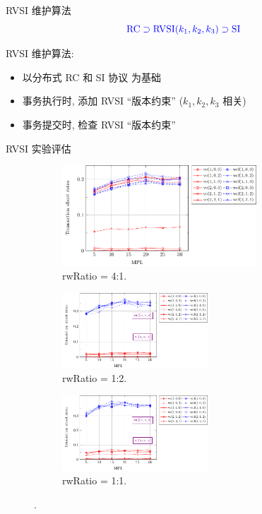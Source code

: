 \begin{frame}{RVSI 维护算法}
  \[
    \textcolor{blue}{\text{RC} \supset \text{RVSI}(k_1, k_2, k_3) \supset \text{SI}}
  \]

  \vspace{0.10cm}

  RVSI 维护算法:
  \begin{itemize}
    \item 以分布式 RC 和 SI 协议 为基础
    \item 事务执行时, 添加 RVSI ``版本约束'' ($k_1, k_2, k_3$ 相关)
    \item 事务提交时, 检查 RVSI ``版本约束''
  \end{itemize}
\end{frame}
\begin{frame}{RVSI 实验评估}
  \begin{figure}
	\begin{subfigure}{0.60\textwidth}
	  \centering
	  \includegraphics[width = 0.80\textwidth]{figures/rvsi-rw4-abort-rates.pdf}
	  \caption{rwRatio = 4:1.}
	\end{subfigure}%

	\begin{subfigure}{0.50\textwidth}
	  \centering
	  \includegraphics[width = 0.60\textwidth]{figures/rvsi-rw05-abort-rates.pdf}
	  \caption{rwRatio = 1:2.}
	\end{subfigure}%
	\begin{subfigure}{0.50\textwidth}
	  \centering
	  \includegraphics[width = 0.60\textwidth]{figures/rvsi-rw1-abort-rates.pdf}
	  \caption{rwRatio = 1:1.}
	\end{subfigure}%
	\caption{.}
  \end{figure}
\end{frame}
